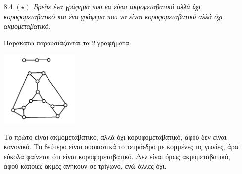\documentclass[a4paper, oneside, 11pt]{article}
\theoremstyle{definition}
\begin{document}
\begin{enumerate}
\begin{proof}
Στη συνέχεια εφαρμόζουμε στο γράφημά μας τον προσανατολισμό του παραπάνω Λήμματος, οπότε κάθε κορυφή έχει εξώβαθμο 0 ή 2. Στην πραγματικότητα, επειδή το άθροισμα των εξώβαθμων είναι ίσο με το
πλήθος των ακμών του γραφήματος και το τελευταίο είναι ίσο με $3\cdot 4k / 2=6k$, θα έχουμε ότι υπάρχουν ακριβώς $k$ κορυφές με εξώβαθμο $0$ και ακριβώς $3k$ κορυφές με εξώβαθμο $2$. Θεωρούμε
ως ανεξάρτητο σύνολο το σύνολο των κορυφών με εξώβαθμο $0$. Είναι προφανώς ανεξάρτητο, αφού αν υπήρχε ακμή μεταξύ αυτών των κορυφών, κάποια από τα δύο άκρα της θα είχε μη μηδενικό εξώβαθμο. Επιπλέον,
το πλήθος των ακμών που θα έχει το γράφημα μετά τη διαγραφή του ανεξάρτητου συνόλου είναι $6k-3k=3k$, αλλά και το πλήθος των κορυφών που θα μείνουν στο γράφημα είναι $4k-k=3k$. Αυτό σημαίνει ότι η
πυκνότητα του γραφήματος που απομένει είναι $1$. Αν αποδείξουμε ότι καμία συνεκτική συνιστώσα δεν μπορεί να είναι δέντρο, τότε κάθε συνιστώσα θα έχει πυκνότητα τουλάχιστον $1$, και άρα θα πρέπει
κάθε συνιστώσα να έχει πυκνότητα ακριβώς $1$, δηλαδή να είναι μονοκυκλική. Έστω τώρα ένας κόμβος $u$ σε μια συνεκτική συνιστώσα $S$. Αφού κάθε κορυφή που δεν ανήκει στο ανεξάρτητο σύνολο έχει εξώβαθμο
$2$, θα έχει και εσώβαθμο $1$. Ακολουθώντας από την $u$ τις προσανατολισμένες ακμές κατά την αντίθετη κατεύθυνση, φτιάχνουμε μια ακολουθία κορυφών με μη μηδενικό εξώβαθμο. Προφανώς αυτή η ακολουθία θα
είναι πεπερασμένη και δεν γίνεται να περιέχει κάποιο κόμβο του ανεξάρτητου συνόλου, αφού αυτοί έχουν μηδενικό εξώβαθμο. Αυτό σημαίνει ότι η ακολουθία θα αρχίσει να επαναλαμβάνεται, άρα θα υπάρχει κύκλος.
Συνεπώς κάθε συνεκτική συνιστώσα που προκύπτει μετά από τη διαγραφή του ανεξάρτητου συνόλου θα έχει πυκνότητα τουλάχιστον $1$ και το ζητούμενο έχει αποδειχθεί.
\end{proof}

	\item[8.4] \emph{$(\star)$ Βρείτε ένα γράφημα που να είναι ακμομεταβατικό αλλά όχι κορυφομεταβατικό και ένα γράφημα που να είναι κορυφομεταβατικό αλλά όχι ακμομεταβατικό.}

Παρακάτω παρουσιάζονται τα 2 γραφήματα:

\includegraphics[width=0.3\textwidth]{./pics/graph2.png}

Το πρώτο είναι ακμομεταβατικό, αλλά όχι κορυφομεταβατικό, αφού δεν είναι κανονικό.
\newline
Το δεύτερο είναι ουσιαστικά το τετράεδρο με κομμένες τις γωνίες, άρα εύκολα φαίνεται ότι είναι κορυφομεταβατικό. Δεν είναι όμως ακμομεταβατικό, αφού κάποιες ακμές ανήκουν σε τρίγωνο, ενώ άλλες όχι.


\end{enumerate}
\end{document}
